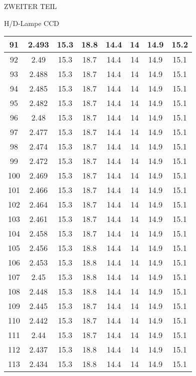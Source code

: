 \begin{appendix}
\begin{chapter}{ZWEITER TEIL}
\begin{section}{H/D-Lampe CCD}
\begin{scriptsize}
\begin{longtable}[htbp]{|c|c|c|c|c|c|c|c|}
            91 & 2.493 & 15.3 & 18.8 & 14.4 & 14 & 14.9 & 15.2 \\ \hline
            92 & 2.49 & 15.3 & 18.7 & 14.4 & 14 & 14.9 & 15.1 \\ \hline
            93 & 2.488 & 15.3 & 18.7 & 14.4 & 14 & 14.9 & 15.1 \\ \hline
            94 & 2.485 & 15.3 & 18.7 & 14.4 & 14 & 14.9 & 15.1 \\ \hline
            95 & 2.482 & 15.3 & 18.7 & 14.4 & 14 & 14.9 & 15.1 \\ \hline
            96 & 2.48 & 15.3 & 18.7 & 14.4 & 14 & 14.9 & 15.1 \\ \hline
            97 & 2.477 & 15.3 & 18.7 & 14.4 & 14 & 14.9 & 15.1 \\ \hline
            98 & 2.474 & 15.3 & 18.7 & 14.4 & 14 & 14.9 & 15.1 \\ \hline
            99 & 2.472 & 15.3 & 18.7 & 14.4 & 14 & 14.9 & 15.1 \\ \hline
            100 & 2.469 & 15.3 & 18.7 & 14.4 & 14 & 14.9 & 15.1 \\ \hline
            101 & 2.466 & 15.3 & 18.7 & 14.4 & 14 & 14.9 & 15.1 \\ \hline
            102 & 2.464 & 15.3 & 18.7 & 14.4 & 14 & 14.9 & 15.1 \\ \hline
            103 & 2.461 & 15.3 & 18.7 & 14.4 & 14 & 14.9 & 15.1 \\ \hline
            104 & 2.458 & 15.3 & 18.7 & 14.4 & 14 & 14.9 & 15.1 \\ \hline
            105 & 2.456 & 15.3 & 18.8 & 14.4 & 14 & 14.9 & 15.1 \\ \hline
            106 & 2.453 & 15.3 & 18.8 & 14.4 & 14 & 14.9 & 15.1 \\ \hline
            107 & 2.45 & 15.3 & 18.8 & 14.4 & 14 & 14.9 & 15.1 \\ \hline
            108 & 2.448 & 15.3 & 18.8 & 14.4 & 14 & 14.9 & 15.1 \\ \hline
            109 & 2.445 & 15.3 & 18.7 & 14.4 & 14 & 14.9 & 15.1 \\ \hline
            110 & 2.442 & 15.3 & 18.7 & 14.4 & 14 & 14.9 & 15.1 \\ \hline
            111 & 2.44 & 15.3 & 18.7 & 14.4 & 14 & 14.9 & 15.1 \\ \hline
            112 & 2.437 & 15.3 & 18.8 & 14.4 & 14 & 14.9 & 15.1 \\ \hline
            113 & 2.434 & 15.3 & 18.8 & 14.4 & 14 & 14.9 & 15.1 \\ \hline

\end{longtable}
\end{scriptsize}
\end{section}
\end{chapter}
\end{appendix}

